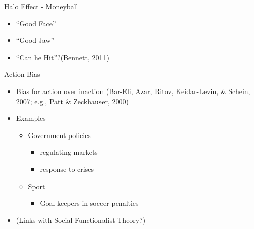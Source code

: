 \documentclass[
  ignorenonframetext,
]{beamer}
\providecommand{\tightlist}{%
  \setlength{\itemsep}{0pt}\setlength{\parskip}{0pt}}\usepackage{longtable,booktabs,array}
\begin{document}
\begin{frame}{Halo Effect - Moneyball}
\protect\hypertarget{halo-effect---moneyball}{}
\begin{itemize}
\tightlist
\item
  ``Good Face''
\end{itemize}

\begin{itemize}
\tightlist
\item
  ``Good Jaw''
\end{itemize}

\begin{itemize}
\tightlist
\item
  ``Can he Hit''?(Bennett, 2011)
\end{itemize}
\end{frame}

\begin{frame}{Action Bias}
\protect\hypertarget{action-bias}{}
\begin{itemize}
\item
  Bias for action over inaction (Bar-Eli, Azar, Ritov, Keidar-Levin, \&
  Schein, 2007; e.g., Patt \& Zeckhauser, 2000)
\item
  Examples

  \begin{itemize}
  \tightlist
  \item
    Government policies

    \begin{itemize}
    \tightlist
    \item
      regulating markets
    \item
      response to crises
    \end{itemize}
  \item
    Sport

    \begin{itemize}
    \tightlist
    \item
      Goal-keepers in soccer penalties
    \end{itemize}
  \end{itemize}
\item
  (Links with Social Functionalist Theory?)
\end{itemize}
\end{frame}
\end{document}
